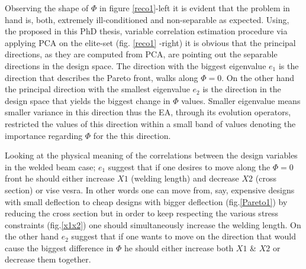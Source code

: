  
Observing the shape of $\Phi$ in figure \ref{reco1}-left it is evident that the problem in hand is, both, extremely ill-conditioned and non-separable as expected. Using, the proposed in this PhD thesis, variable correlation estimation procedure via applying PCA on the elite-set (fig. \ref{reco1} -right) it is obvious that the principal directions, as they are computed from PCA, are pointing out the separable directions in the design space. The direction with the biggest eigenvalue $e_1$ is the direction that describes the Pareto front, walks along $\Phi=0$. On the other hand the principal direction with the smallest eigenvalue $e_2$ is the direction in the design space that yields the biggest change in $\Phi$ values. Smaller eigenvalue means smaller variance in this direction thus the EA, through its evolution operators, restricted the values of this direction within a small band of values denoting the importance regarding $\Phi$ for the this direction. 

Looking at the physical meaning of the correlations between the design variables in the welded beam case; $e_1$ suggest that if one desires to move along the  $\Phi=0$ front he should either increase $X1$ (welding length) and decrease $X2$ (cross section) or vise vesra. In other words one can move from, say, expensive designs with small deflection to cheap designs with bigger deflection (fig.\ref{Pareto1}) by reducing the cross section but in order to keep respecting the various stress constraints (fig.\ref{x1x2}) one should simultaneously increase the welding length. On the other hand $e_2$ suggest that if one wants to move on the direction that would cause the biggest difference in $\Phi$ he should either increase both $X1$ \& $X2$ or decrease them together.          

